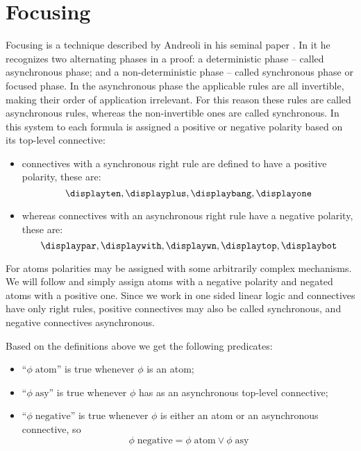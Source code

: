 \section{Focusing}
Focusing is a technique described by Andreoli in his seminal paper \cite{Focusing}.
In it he recognizes two alternating phases in a proof: a deterministic phase -- called asynchronous phase; and a non-deterministic phase -- called synchronous phase or focused phase.
In the asynchronous phase the applicable rules are all invertible, making their order of application irrelevant.
For this reason these rules are called asynchronous rules, whereas the non-invertible ones are called synchronous.
In this system to each formula is assigned a positive or negative polarity based on its top-level connective:
\begin{itemize}
	\item connectives with a synchronous right rule are defined to have a positive polarity, these are:
		$$ \displayten, \displayplus, \displaybang, \displayone$$
	\item whereas connectives with an asynchronous right rule have a negative polarity, these are:
		$$ \displaypar, \displaywith, \displaywn, \displaytop, \displaybot$$
\end{itemize}
For atoms polarities may be assigned with some arbitrarily complex mechanisms.
We will follow \cite{LiangMiller} and simply assign atoms with a negative polarity and negated atoms with a positive one.
Since we work in one sided linear logic and connectives have only right rules, positive connectives may also be called synchronous, and negative connectives asynchronous.
\begin{define}\label{def:focusing predicates}
	Based on the definitions above we get the following predicates:
	\begin{itemize}
		\item ``$\phi \; \mathrm{atom}$'' is true whenever $\phi$ is an atom;
		\item ``$\phi \; \mathrm{asy}$'' is true whenever $\phi$ has as an asynchronous top-level connective;
		\item ``$\phi \; \mathrm{negative}$'' is true whenever $\phi$ is either an atom or an asynchronous connective, so
			$$ \phi \; \mathrm{negative} = \phi \; \mathrm{atom} \vee \phi \; \mathrm{asy} $$
	\end{itemize}
\end{define}

